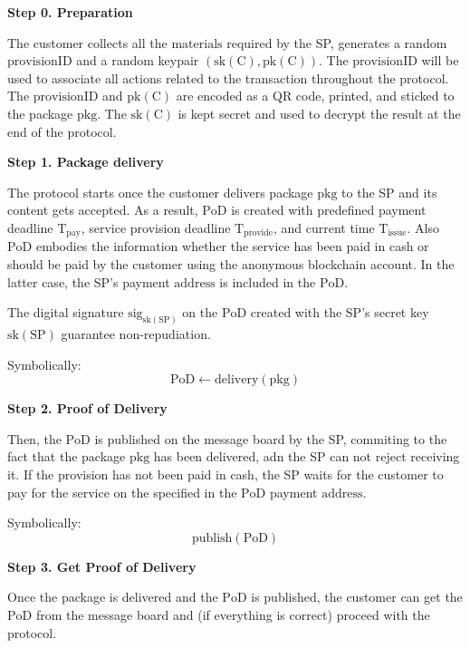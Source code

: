 \documentclass{ieeeaccess}
\begin{document}
\noindent \textbf
{Step 0.  Preparation}\label{step-0-preparation}

The customer collects all the $\mathrm{materials}$ required by the SP, generates a random $\mathrm{provisionID}$ and a random keypair $(\mathrm{sk(C)},\mathrm{pk(C)})$. The $\mathrm{provisionID}$ will be used to associate all actions related to the transaction throughout the protocol. The $\mathrm{provisionID}$ and $\mathrm{pk(C)}$ are encoded as a QR code, printed, and sticked to the package $\mathrm{pkg}$. The $\mathrm{sk(C)}$ is kept secret and used to decrypt the $\mathrm{result}$ at the end of the protocol.

\noindent \textbf
{Step 1. Package delivery}\label{step-1-package-delivery}

The protocol starts once the customer delivers package $\mathrm{pkg}$ to the SP and its content gets accepted. As a result, $\mathrm{PoD}$ is created with predefined payment deadline $\mathrm{T}_\mathrm{pay}$, service provision deadline $\mathrm{T}_\mathrm{provide}$, and current time $\mathrm{T}_\mathrm{issue}$. Also $\mathrm{PoD}$ embodies the information whether the service has been paid in cash or should be paid by the customer using the anonymous blockchain account. In the latter case, the SP's payment $\mathrm{address}$ is included in the $\mathrm{PoD}$.

The digital signature $\mathrm{sig}_{\mathrm{sk}(\mathrm{SP})}$ on the $\mathrm{PoD}$ created with the SP's secret key $\mathrm{sk}(\mathrm{SP})$ guarantee non-repudiation.

Symbolically: 
\[
\mathrm{PoD \gets delivery(pkg)}
\]

\noindent \textbf
{Step 2. Proof of Delivery}\label{step-2-pod}

Then, the $\mathrm{PoD}$ is published on the message board by the SP, commiting to the fact that the package $\mathrm{pkg}$ has been delivered, adn the SP can not reject receiving it. If the provision has not been paid in cash, the SP waits for the customer to pay for the service on the specified in the $\mathrm{PoD}$ payment $\mathrm{address}$.

Symbolically: 
\[
\mathrm{publish(PoD)}
\]

\noindent \textbf
{Step 3. Get Proof of Delivery}\label{step-3-get-pod}

Once the package is delivered and the $\mathrm{PoD}$ is published, the customer can get the $\mathrm{PoD}$ from the message board and (if everything is correct) proceed with the protocol.
\end{document}
